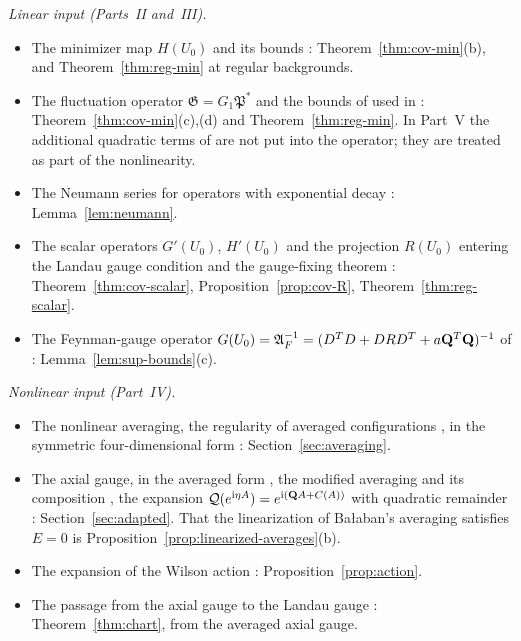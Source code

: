 \emph{Linear input (Parts~II and~III).}
\begin{itemize}
\item The minimizer map $H(U_0)$ and its bounds \cite[(45), (46)]{BalVar}: Theorem~\ref{thm:cov-min}(b), and Theorem~\ref{thm:reg-min} at regular backgrounds.
\item The fluctuation operator $\mathfrak G=G_1\mathfrak P^*$ and the bounds of \cite[Theorem~3.13]{BalBackground} used in \cite[(110)--(120)]{BalVar}: Theorem~\ref{thm:cov-min}(c),(d) and Theorem~\ref{thm:reg-min}. In Part~V the additional quadratic terms of \cite[(79)]{BalVar} are not put into the operator; they are treated as part of the nonlinearity.
\item The Neumann series for operators with exponential decay \cite[(68)--(71)]{BalVar}: Lemma~\ref{lem:neumann}.
\item The scalar operators $G'(U_0)$, $H'(U_0)$ and the projection $R(U_0)$ entering the Landau gauge condition \cite[(21)]{BalVar} and the gauge-fixing theorem \cite[(1.91)--(1.100)]{BalReg}: Theorem~\ref{thm:cov-scalar}, Proposition~\ref{prop:cov-R}, Theorem~\ref{thm:reg-scalar}.
\item The Feynman-gauge operator $G(U_0)=\mathfrak A_F^{-1}=(D^TD+DRD^T+a\mathbf Q^T\mathbf Q)^{-1}$ of \cite[(1.58)]{BalReg}: Lemma~\ref{lem:sup-bounds}(c).
\end{itemize}

\emph{Nonlinear input (Part~IV).}
\begin{itemize}
\item The nonlinear averaging, the regularity of averaged configurations \cite[Props.~1, 2]{BalAvg}, in the symmetric four-dimensional form \cite[(0.3)--(0.12)]{BalYM4I}: Section~\ref{sec:averaging}.
\item The axial gauge, in the averaged form \cite[pp.~253--254]{BalYM4I}, the modified averaging and its composition \cite[Sect.~C]{BalAvg}, the expansion $\mathcal Q(e^{\mathrm i\eta A})=e^{\mathrm i(\mathbf Q A+C(A))}$ with quadratic remainder \cite[Props.~3--5]{BalAvg}: Section~\ref{sec:adapted}. That the linearization of Ba\l aban's averaging satisfies $E=0$ \cite[(3.114)--(3.115)]{BalBackground} is Proposition~\ref{prop:linearized-averages}(b).
\item The expansion of the Wilson action \cite[(25)--(40)]{BalVar}: Proposition~\ref{prop:action}.
\item The passage from the axial gauge to the Landau gauge \cite[Theorem~2]{BalReg}: Theorem~\ref{thm:chart}, from the averaged axial gauge.
\end{itemize}

